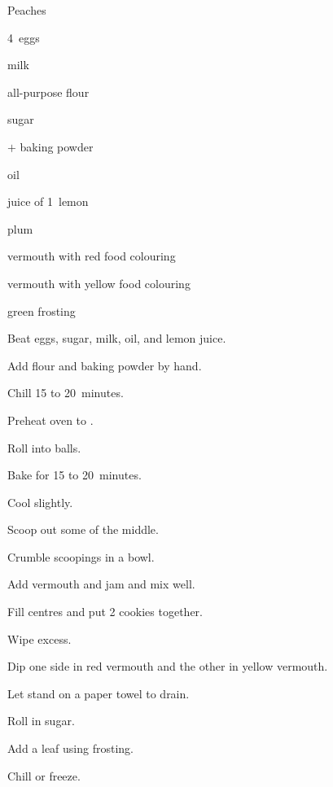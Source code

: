 \begin{recipe}{Peaches}{}{}

\begin{ingredients}
\item 4~eggs
\item {} milk
\item {} all-purpose flour
\item \C{1\half} sugar
\item {}$+$ baking powder
\item \C{1\quarter} oil
\item juice of 1~lemon
\item {} plum 
\item \C{\threequarter} 
\item vermouth with red food colouring
\item vermouth with yellow food colouring
\item green frosting
\end{ingredients}

\begin{directions}
\item Beat eggs, sugar, milk, oil, and lemon juice.
\item Add flour and baking powder by hand.
\item Chill 15 to 20~minutes.
\item Preheat oven to .
\item Roll into  balls.
\item Bake for 15 to 20~minutes.
\item Cool slightly.
\item Scoop out some of the middle.
\item Crumble scoopings in a bowl.
\item Add vermouth and jam and mix well.
\item Fill centres and put 2 cookies together.
\item Wipe excess.
\item Dip one side in red vermouth and the other in yellow vermouth.
\item Let stand on a paper towel to drain.
\item Roll in sugar.
\item Add a leaf using frosting.
\item Chill or freeze.
\end{directions}

\end{recipe}
